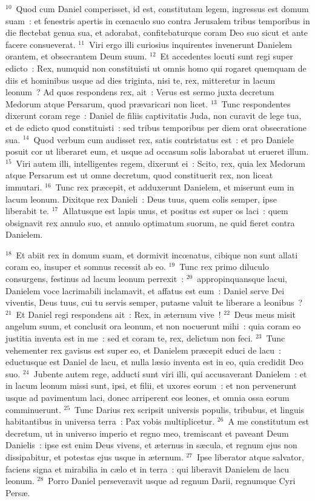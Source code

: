 ${}^{10}$~Quod cum Daniel comperisset, id est, constitutam legem, ingressus est domum suam~: et fenestris apertis in cœnaculo suo contra Jerusalem tribus temporibus in die flectebat genua sua, et adorabat, confitebaturque coram Deo suo sicut et ante facere consueverat.
${}^{11}$~Viri ergo illi curiosius inquirentes invenerunt Danielem orantem, et obsecrantem Deum suum.
${}^{12}$~Et accedentes locuti sunt regi super edicto~: Rex, numquid non constituisti ut omnis homo qui rogaret quemquam de diis et hominibus usque ad dies triginta, nisi te, rex, mitteretur in lacum leonum~? Ad quos respondens rex, ait~: Verus est sermo juxta decretum Medorum atque Persarum, quod pr\ae varicari non licet.
${}^{13}$~Tunc respondentes dixerunt coram rege~: Daniel de filiis captivitatis Juda, non curavit de lege tua, et de edicto quod constituisti~: sed tribus temporibus per diem orat obsecratione sua.
${}^{14}$~Quod verbum cum audisset rex, satis contristatus est~: et pro Daniele posuit cor ut liberaret eum, et usque ad occasum solis laborabat ut erueret illum.
${}^{15}$~Viri autem illi, intelligentes regem, dixerunt ei~: Scito, rex, quia lex Medorum atque Persarum est ut omne decretum, quod constituerit rex, non liceat immutari.
${}^{16}$~Tunc rex pr\ae cepit, et adduxerunt Danielem, et miserunt eum in lacum leonum. Dixitque rex Danieli~: Deus tuus, quem colis semper, ipse liberabit te.
${}^{17}$~Allatusque est lapis unus, et positus est super os laci~: quem obsignavit rex annulo suo, et annulo optimatum suorum, ne quid fieret contra Danielem.


${}^{18}$~Et abiit rex in domum suam, et dormivit incœnatus, cibique non sunt allati coram eo, insuper et somnus recessit ab eo.
${}^{19}$~Tunc rex primo diluculo consurgens, festinus ad lacum leonum perrexit~:
${}^{20}$~appropinquansque lacui, Danielem voce lacrimabili inclamavit, et affatus est eum~: Daniel serve Dei viventis, Deus tuus, cui tu servis semper, putasne valuit te liberare a leonibus~?
${}^{21}$~Et Daniel regi respondens ait~: Rex, in \ae ternum vive~!
${}^{22}$~Deus meus misit angelum suum, et conclusit ora leonum, et non nocuerunt mihi~: quia coram eo justitia inventa est in me~: sed et coram te, rex, delictum non feci.
${}^{23}$~Tunc vehementer rex gavisus est super eo, et Danielem pr\ae cepit educi de lacu~: eductusque est Daniel de lacu, et nulla l\ae sio inventa est in eo, quia credidit Deo suo.
${}^{24}$~Jubente autem rege, adducti sunt viri illi, qui accusaverant Danielem~: et in lacum leonum missi sunt, ipsi, et filii, et uxores eorum~: et non pervenerunt usque ad pavimentum laci, donec arriperent eos leones, et omnia ossa eorum comminuerunt.
${}^{25}$~Tunc Darius rex scripsit universis populis, tribubus, et linguis habitantibus in universa terra~: Pax vobis multiplicetur.
${}^{26}$~A me constitutum est decretum, ut in universo imperio et regno meo, tremiscant et paveant Deum Danielis~: ipse est enim Deus vivens, et \ae ternus in s\ae cula, et regnum ejus non dissipabitur, et potestas ejus usque in \ae ternum.
${}^{27}$~Ipse liberator atque salvator, faciens signa et mirabilia in c\ae lo et in terra~: qui liberavit Danielem de lacu leonum.
${}^{28}$~Porro Daniel perseveravit usque ad regnum Darii, regnumque Cyri Pers\ae .

